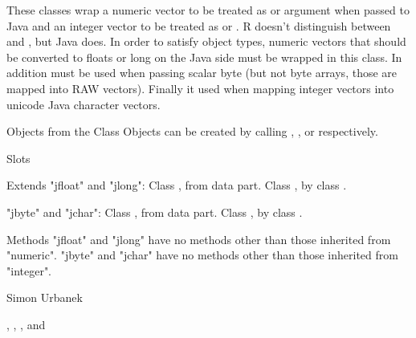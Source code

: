 \begin{Description}\relax
These classes wrap a numeric vector to be treated as
 or  argument when passed to Java and an
integer vector to be treated as  or . R doesn't
distinguish between  and , but Java
does. In order to satisfy object types, numeric vectors that should be
converted to floats or long on the Java side must be wrapped in this
class. In addition  must be used when passing scalar byte
(but not byte arrays, those are mapped into RAW vectors). Finally
 it used when mapping integer vectors into unicode Java
character vectors.
\end{Description}
\begin{Section}{Objects from the Class}
Objects can be created by calling ,
,  or 
respectively.
\end{Section}
\begin{Section}{Slots}
\end{Section}
\begin{Section}{Extends}
"jfloat" and "jlong":
Class , from data part.
Class , by class .

"jbyte" and "jchar":
Class , from data part.
Class , by class .
\end{Section}
\begin{Section}{Methods}
"jfloat" and "jlong" have no methods other than those inherited from "numeric".
"jbyte" and "jchar" have no methods other than those inherited from "integer".
\end{Section}
\begin{Author}\relax
Simon Urbanek
\end{Author}
\begin{SeeAlso}\relax
{}, , ,  and 
\end{SeeAlso}

